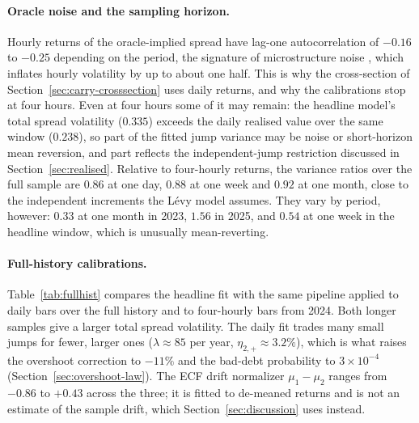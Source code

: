 \documentclass[11pt]{article}
\theoremstyle{plain}
\theoremstyle{definition}
\theoremstyle{remark}
\begin{document}
\paragraph{Oracle noise and the sampling horizon.} Hourly returns of the oracle-implied spread have
lag-one autocorrelation of $-0.16$ to $-0.25$ depending on the period, the signature of microstructure noise
\citep{AitSahaliaMyklandZhang2005}, which inflates hourly volatility by up to about one half. This is why
the cross-section of Section~\ref{sec:carry-crosssection} uses daily returns, and why the
calibrations stop at four hours. Even at four hours some of it may remain: the headline model's total
spread volatility ($0.335$) exceeds the daily realised value over the same window ($0.238$), so part
of the fitted jump variance may be noise or short-horizon mean reversion, and part reflects the
independent-jump restriction discussed in Section~\ref{sec:realised}. Relative to four-hourly returns, the variance ratios
\citep{LoMacKinlay1988} over the full sample are $0.86$ at one day, $0.88$ at one week and $0.92$
at one month, close to the independent increments the L\'evy model assumes. They vary by period,
however: $0.33$ at one month in 2023, $1.56$ in 2025, and $0.54$ at one week in the headline window,
which is unusually mean-reverting.

\paragraph{Full-history calibrations.} Table~\ref{tab:fullhist} compares the headline fit with the
same pipeline applied to daily bars over the full history and to four-hourly bars from 2024. Both
longer samples give a larger total spread volatility. The daily fit trades many small jumps for
fewer, larger ones ($\lambda\approx85$ per year, $\eta_{2,+}\approx3.2\%$), which is what raises the
overshoot correction to $-11\%$ and the bad-debt probability to $3\times10^{-4}$
(Section~\ref{sec:overshoot-law}). The ECF drift normalizer $\mu_1-\mu_2$ ranges from $-0.86$ to
$+0.43$ across the three; it is fitted to de-meaned returns and is not an estimate of the sample
drift, which Section~\ref{sec:discussion} uses instead.
\end{document}
